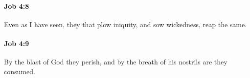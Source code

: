 		\paragraph{Job 4:8} %
			\label{JOB-4-8}

			Even as I have seen, they that plow iniquity, and sow wickedness, reap the same.


		\paragraph{Job 4:9} %
			\label{JOB-4-9}

			By the blast of God they perish, and by the breath of his nostrils are they consumed.


